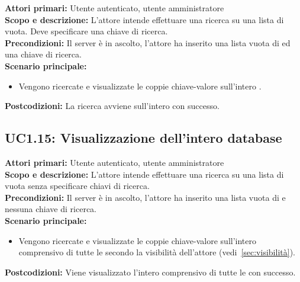 \documentclass{scalatekids-article}
\begin{document}
\textbf{Attori primari:} Utente autenticato, utente amministratore\\
\textbf{Scopo e descrizione:} L'attore intende effettuare una ricerca su una lista di  vuota. Deve specificare una chiave di ricerca.\\
\textbf{Precondizioni:} Il server è in ascolto, l'attore ha inserito una lista vuota di  ed una chiave di ricerca.\\
\textbf{Scenario principale:}
\begin{itemize}
\item Vengono ricercate e visualizzate le coppie chiave-valore sull'intero .
\end{itemize}
\textbf{Postcodizioni:} La ricerca avviene sull'intero  con successo.

\subsection{UC1.15: Visualizzazione dell'intero database}

\textbf{Attori primari:} Utente autenticato, utente amministratore\\
\textbf{Scopo e descrizione:} L'attore intende effettuare una ricerca su una lista di  vuota senza specificare chiavi di ricerca.\\
\textbf{Precondizioni:} Il server è in ascolto, l'attore ha inserito una lista vuota di  e nessuna chiave di ricerca.\\
\textbf{Scenario principale:}
\begin{itemize}
\item Vengono ricercate e visualizzate le coppie chiave-valore sull'intero  comprensivo di tutte le  secondo la visibilità dell'attore (vedi~\ref{sec:visibilità}).
\end{itemize}
\textbf{Postcodizioni:} Viene visualizzato l'intero  comprensivo di tutte le  con successo.

\end{document}
